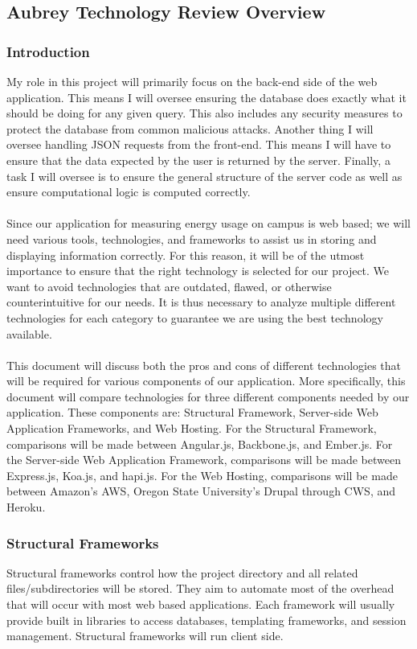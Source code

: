 \subsection{Aubrey Technology Review Overview}
\subsubsection{Introduction}
	My role in this project will primarily focus on the back-end side of the web application. This means I will oversee ensuring the database does exactly what it should be doing for any given query. This also includes any security measures to protect the database from common malicious attacks. Another thing I will oversee handling JSON requests from the front-end. This means I will have to ensure that the data expected by the user is returned by the server. Finally, a task I will oversee is to ensure the general structure of the server code as well as ensure computational logic is computed correctly.\\\\
	Since our application for measuring energy usage on campus is web based; we will need various tools, technologies, and frameworks to assist us in storing and displaying information correctly. For this reason, it will be of the utmost importance to ensure that the right technology is selected for our project. We want to avoid technologies that are outdated, flawed, or otherwise counterintuitive for our needs. It is thus necessary to analyze multiple different technologies for each category to guarantee we are using the best technology available.\\\\
This document will discuss both the pros and cons of different technologies that will be required for various components of our application. More specifically, this document will compare technologies for three different components needed by our application. These components are: Structural Framework, Server-side Web Application Frameworks, and Web Hosting. For the Structural Framework, comparisons will be made between Angular.js, Backbone.js, and Ember.js. For the Server-side Web Application Framework, comparisons will be made between Express.js, Koa.js, and hapi.js. For the Web Hosting, comparisons will be made between Amazon's AWS, Oregon State University's Drupal through CWS, and Heroku.

\subsubsection{Structural Frameworks}
	Structural frameworks control how the project directory and all related files/subdirectories will be stored. They aim to automate most of the overhead that will occur with most web based applications. Each framework will usually provide built in libraries to access databases, templating frameworks, and session management. Structural frameworks will run client side.
